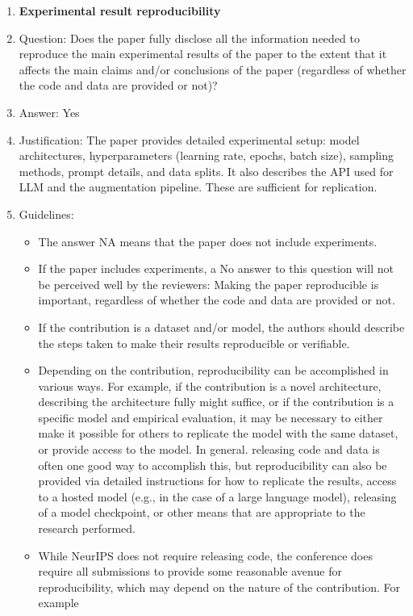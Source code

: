 \documentclass{article}
\newcommand{\answerYes}[1][]{Yes}
\begin{document}
\begin{enumerate}
\item {\bf Experimental result reproducibility}
    \item[] Question: Does the paper fully disclose all the information needed to reproduce the main experimental results of the paper to the extent that it affects the main claims and/or conclusions of the paper (regardless of whether the code and data are provided or not)?
    \item[] Answer: \answerYes{}
    \item[] Justification: The paper provides detailed experimental setup: model architectures, hyperparameters (learning rate, epochs, batch size), sampling methods, prompt details, and data splits. It also describes the API used for LLM and the augmentation pipeline. These are sufficient for replication.
    \item[] Guidelines:
    \begin{itemize}
        \item The answer NA means that the paper does not include experiments.
        \item If the paper includes experiments, a No answer to this question will not be perceived well by the reviewers: Making the paper reproducible is important, regardless of whether the code and data are provided or not.
        \item If the contribution is a dataset and/or model, the authors should describe the steps taken to make their results reproducible or verifiable. 
        \item Depending on the contribution, reproducibility can be accomplished in various ways. For example, if the contribution is a novel architecture, describing the architecture fully might suffice, or if the contribution is a specific model and empirical evaluation, it may be necessary to either make it possible for others to replicate the model with the same dataset, or provide access to the model. In general. releasing code and data is often one good way to accomplish this, but reproducibility can also be provided via detailed instructions for how to replicate the results, access to a hosted model (e.g., in the case of a large language model), releasing of a model checkpoint, or other means that are appropriate to the research performed.
        \item While NeurIPS does not require releasing code, the conference does require all submissions to provide some reasonable avenue for reproducibility, which may depend on the nature of the contribution. For example
        \begin{enumerate}

\end{enumerate}
\end{itemize}
\end{enumerate}
\end{document}
